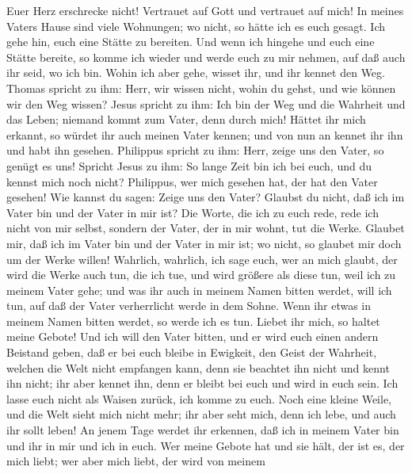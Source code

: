  Euer Herz erschrecke nicht! Vertrauet auf Gott und
vertrauet auf mich!  In meines Vaters Hause sind viele
Wohnungen; wo nicht, so hätte ich es euch gesagt. Ich gehe hin, euch
eine Stätte zu bereiten.  Und wenn ich hingehe und euch
eine Stätte bereite, so komme ich wieder und werde euch zu mir nehmen,
auf daß auch ihr seid, wo ich bin.  Wohin ich aber gehe,
wisset ihr, und ihr kennet den Weg.  Thomas spricht zu
ihm: Herr, wir wissen nicht, wohin du gehst, und wie können wir den Weg
wissen?  Jesus spricht zu ihm: Ich bin der Weg und die
Wahrheit und das Leben; niemand kommt zum Vater, denn durch mich!
 Hättet ihr mich erkannt, so würdet ihr auch meinen Vater
kennen; und von nun an kennet ihr ihn und habt ihn gesehen.
 Philippus spricht zu ihm: Herr, zeige uns den Vater, so
genügt es uns!  Spricht Jesus zu ihm: So lange Zeit bin
ich bei euch, und du kennst mich noch nicht? Philippus, wer mich gesehen
hat, der hat den Vater gesehen! Wie kannst du sagen: Zeige uns den
Vater?  Glaubst du nicht, daß ich im Vater bin und der
Vater in mir ist? Die Worte, die ich zu euch rede, rede ich nicht von
mir selbst, sondern der Vater, der in mir wohnt, tut die Werke.
 Glaubet mir, daß ich im Vater bin und der Vater in mir
ist; wo nicht, so glaubet mir doch um der Werke willen! 
Wahrlich, wahrlich, ich sage euch, wer an mich glaubt, der wird die
Werke auch tun, die ich tue, und wird größere als diese tun, weil ich zu
meinem Vater gehe;  und was ihr auch in meinem Namen
bitten werdet, will ich tun, auf daß der Vater verherrlicht werde in dem
Sohne.  Wenn ihr etwas in meinem Namen bitten werdet, so
werde ich es tun.  Liebet ihr mich, so haltet meine
Gebote!  Und ich will den Vater bitten, und er wird euch
einen andern Beistand geben, daß er bei euch bleibe in Ewigkeit,
 den Geist der Wahrheit, welchen die Welt nicht empfangen
kann, denn sie beachtet ihn nicht und kennt ihn nicht; ihr aber kennet
ihn, denn er bleibt bei euch und wird in euch sein.  Ich
lasse euch nicht als Waisen zurück, ich komme zu euch. 
Noch eine kleine Weile, und die Welt sieht mich nicht mehr; ihr aber
seht mich, denn ich lebe, und auch ihr sollt leben!  An
jenem Tage werdet ihr erkennen, daß ich in meinem Vater bin und ihr in
mir und ich in euch.  Wer meine Gebote hat und sie hält,
der ist es, der mich liebt; wer aber mich liebt, der wird von meinem
